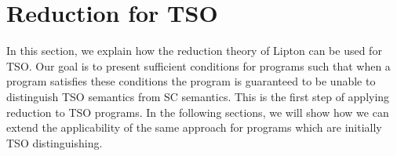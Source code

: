 \documentclass[preprint,9pt]{sigplanconf}
\begin{document}
\newcommand{\tsoalph}{\ensuremath{\Sigma}}
\newcommand{\aliprojx}[2]{\ensuremath{#1\downarrow_{#2}}}
\newcommand{\aliperm}{\ensuremath{\sim_{\pi}}}
\newcommand{\alipotso}{\ensuremath{<^{tso}}}
\newcommand{\alipotsox}[1]{\ensuremath{\alipotso_{#1}}}
\newcommand{\aliposc}{\ensuremath{<^{sc}}}
\newcommand{\aliposcx}[1]{\ensuremath{\aliposc_{#1}}}
\newcommand{\alimatch}{\ensuremath{\mu}}
\newcommand{\alimatchx}[1]{\ensuremath{\alimatch(#1)}}

\newtheorem{definition}{Definition}
\newtheorem{proposition}{Proposition}
\newtheorem{lemma}{Lemma}
\newtheorem{corollary}{Corollary}
\newtheorem{theorem}{Theorem}
\newtheorem{proof}{Proof}



\newcommand{\alisplit}{\ensuremath{\mathsf{Split}}}
\newcommand{\alisplitx}[1]{\ensuremath{\alisplit(#1)}}
\newcommand{\alisplitprogx}[1]{\ensuremath{#1^S}}
\newcommand{\aliloctrans}{\ensuremath{\tau_{l}}}
\newcommand{\aliloctransx}[1]{\ensuremath{\aliloctrans(#1)}}
\newcommand{\aliremtrans}{\ensuremath{\tau_{r}}}
\newcommand{\aliremtransx}[1]{\ensuremath{\aliremtrans(#1)}}
\newcommand{\aliequivgeneric}{\ensuremath{\simeq}}

\section{Reduction for TSO}
\label{sec:reduction-for-tso}
In this section, we explain how the reduction theory of Lipton can be used for TSO.
Our goal is to present sufficient conditions for programs such that when a program satisfies these conditions the program is guaranteed to be unable to distinguish TSO semantics from SC semantics. 
This is the first step of applying reduction to TSO programs.
In the following sections, we will show how we can extend the applicability of the same approach for programs which are initially TSO distinguishing.
\end{document}
